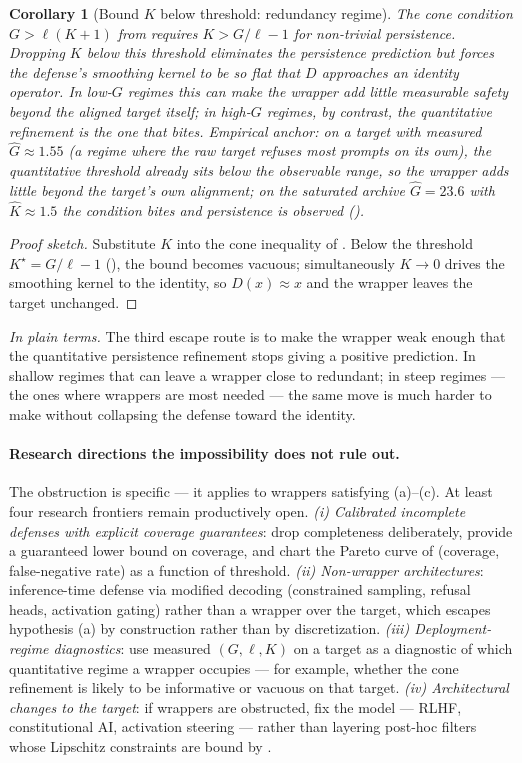 \documentclass[11pt]{article}
\newtheorem{corollary}[theorem]{Corollary}
\begin{document}
\begin{corollary}[Bound $K$ below threshold: redundancy regime]
\label{cor:drop-K}
The cone condition $G > \ell(K+1)$ from  requires
$K > G/\ell - 1$ for non-trivial persistence. Dropping $K$ below this
threshold eliminates the persistence prediction but forces the
defense's smoothing kernel to be so flat that $D$ approaches an
identity operator. In low-$G$ regimes this can make the wrapper add
little measurable safety beyond the aligned target itself; in
high-$G$ regimes, by contrast, the quantitative refinement is the one
that bites.
Empirical anchor: on a target with measured $\hat G \approx 1.55$
(a regime where the raw target refuses most prompts on its own), the
quantitative threshold already sits below the observable range, so the
wrapper adds little beyond the target's own alignment; on the
saturated archive $\hat G = 23.6$ with
$\hat K \approx 1.5$ the condition bites and persistence is observed
().
\end{corollary}
\begin{proof}[Proof sketch]
Substitute $K$ into the cone inequality of . Below the
threshold $K^\star = G/\ell - 1$ (), the bound
becomes vacuous; simultaneously $K \to 0$ drives the smoothing kernel
to the identity, so $D(x) \approx x$ and the wrapper leaves the
target unchanged.
\end{proof}

\noindent\emph{In plain terms.} The third escape route is to make the
wrapper weak enough that the quantitative persistence refinement stops
giving a positive prediction. In shallow regimes that can leave a
wrapper close to redundant; in steep regimes --- the ones where
wrappers are most needed --- the same move is much harder to make
without collapsing the defense toward the identity.

\paragraph{Research directions the impossibility does not rule out.}
The obstruction is specific --- it applies to wrappers satisfying
(a)--(c). At least four research frontiers remain productively open.
\emph{(i) Calibrated incomplete defenses with explicit coverage
guarantees}: drop completeness deliberately, provide a guaranteed
lower bound on coverage, and chart the Pareto curve of (coverage,
false-negative rate) as a function of threshold. \emph{(ii) Non-wrapper
architectures}: inference-time defense via modified decoding
(constrained sampling, refusal heads, activation gating) rather than a
wrapper over the target, which escapes hypothesis (a) by construction
rather than by discretization. \emph{(iii) Deployment-regime
diagnostics}: use measured $(G, \ell, K)$ on a target as a diagnostic
of which quantitative regime a wrapper occupies --- for example,
whether the cone refinement is likely to be informative or vacuous on
that target. \emph{(iv) Architectural changes to the target}: if
wrappers are obstructed, fix the model --- RLHF, constitutional AI,
activation steering --- rather than layering post-hoc filters whose
Lipschitz constraints are bound by .
\end{document}
